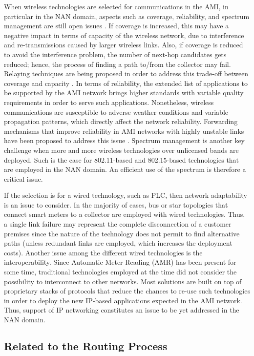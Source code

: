 \documentclass[11pt,draftclsnofoot,onecolumn]{IEEEtran}
\begin{document}
When wireless technologies are selected for communications in the AMI, in particular in the NAN domain, aspects such as coverage, reliability, and spectrum management are still open issues \cite{Sun2012}. If coverage is increased, this may have a negative impact in terms of capacity of the wireless network, due to interference and re-transmissions caused by larger wireless links. Also, if coverage is reduced to avoid the interference problem, the number of next-hop candidates gets reduced; hence, the process of finding a path to/from the collector may fail. Relaying techniques are being proposed in order to address this trade-off between coverage and capacity \cite{Sun2012}. In terms of reliability, the extended list of applications to be supported by the AMI network brings higher standards with variable quality requirements in order to serve such applications. Nonetheless, wireless communications are susceptible to adverse weather conditions and variable propagation patterns, which directly affect the network reliability. Forwarding mechanisms that improve reliability in AMI networks with highly unstable links have been proposed to address this issue \cite{Cespedes2012}. Spectrum management is another key challenge when more and more wireless technologies over unlicensed bands are deployed. Such is the case for 802.11-based and 802.15-based technologies that are employed in the NAN domain. An efficient use of the spectrum is therefore a critical issue.

If the selection is for a wired technology, such as PLC, then network adaptability is an issue to consider. In the majority of cases, bus or star topologies that connect smart meters to a collector are employed with wired technologies. Thus, a single link failure may represent the complete disconnection of a customer premises since the nature of the technology does not permit to find alternative paths (unless redundant links are employed, which increases the deployment costs).  Another issue among the different wired technologies is the interoperability. Since Automatic Meter Reading (AMR) has been present for some time, traditional technologies employed at the time did not consider the possibility to interconnect to other networks. Most solutions are built on top of proprietary stacks of protocols that reduce the chances to re-use such technologies in order to deploy the new IP-based applications expected in the AMI network. Thus, support of IP networking constitutes an issue to be yet addressed in the NAN domain. 

\subsection{Related to the Routing Process}
\end{document}
